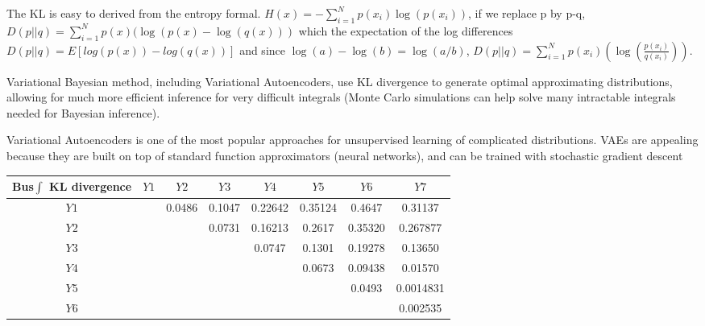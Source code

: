 \documentclass[9pt,twocolumn,twoside]{pnas-new}
\begin{document}
The KL is easy to derived from the entropy formal. 
$H(x) = -\sum_{i=1}^{N} p(x_i)\log(p(x_i))$, if we replace p by p-q, $D(p||q) = \sum_{i=1}^{N} p(x)(\log(p(x)-\log(q(x)))$ which the expectation of the log differences $D(p||q) =E[log(p(x)) - log(q(x))]$ and since $\log(a) -\log(b) = \log(a/b)$, 
$D(p||q) = \sum_{i=1}^{N}  p(x_i)(\log(\frac{p(x_i)}{q(x_i)}))$. 

Variational Bayesian method, including Variational Autoencoders, use KL divergence to generate optimal approximating distributions, allowing for much more efficient inference for very difficult integrals (Monte Carlo simulations can help solve many intractable integrals needed for Bayesian inference).

Variational Autoencoders is one of the most popular approaches for unsupervised learning of complicated distributions. VAEs are appealing because they are built on top of standard function approximators (neural networks), and can be trained with stochastic gradient descent

\begin{center}
\begin{tabular}{SSSSSSSS} \toprule
    {Bus$\int$ KL divergence} & {${Y1}$} & {${Y2}$} & {${Y3}$} & {${Y4}$} & {${Y5}$} & {${Y6}$} & {${Y7}$} \\ \midrule
    {${Y1}$} 	&	&0.0486	&0.1047	&0.22642	&0.35124 &0.4647	&0.31137 \\
    {${Y2}$} 	&	&		&0.0731	&0.16213	&0.2617	&0.35320	&0.267877 \\ %
    {${Y3}$}    &	&		&		&0.0747		&0.1301	&0.19278	&0.13650 \\  
    {${Y4}$}  	&	&		&		&			&0.0673	&0.09438	&0.01570 \\ 
    {${Y5}$}  	&	&		&		&			&		&0.0493		&0.0014831 \\
    {${Y6}$}  	&	&		&		&			&		&			&0.002535 \\ \bottomrule
\end{tabular}
\end{center}
\end{document}
